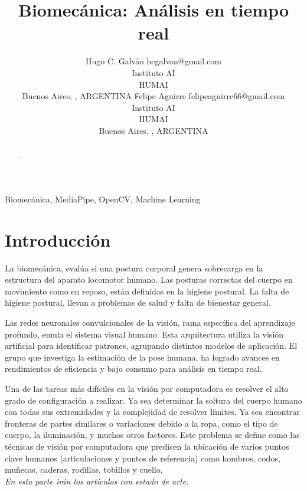\documentclass[twoside,11pt]{article}
\begin{document}
\title{Biomecánica: Análisis en tiempo real}

\author{\name Hugo C. Galván \email hcgalvan@gmail.com \\
       \addr Instituto AI\\
       HUMAI\\
       Buenos Aires, , ARGENTINA
       \AND
       \name Felipe Aguirre \email felipeaguirre66@gmail.com \\
       \addr Instituto AI\\
       HUMAI\\
       Buenos Aires, , ARGENTINA}

\editor{ }

\maketitle

\begin{abstract}%
.
\end{abstract}

\begin{keywords}
  Biomecánica, MediaPipe, OpenCV, Machine Learning
\end{keywords}

\section{Introducción}

La biomecánica, evalúa si una postura corporal genera sobrecarga 
en la estructura del aparato locomotor humano. 
Las posturas correctas del cuerpo en movimiento como en reposo, 
están definidas en la higiene postural. La falta de higiene postural, 
llevan a problemas de salud y falta de bienestar general.

Las redes neuronales convulcionales de la visión, rama específica del aprendizaje 
profundo, emula el sistema visual humano. Esta arquitectura utiliza 
la visión artificial para identificar patrones, agrupando distintos 
modelos de aplicación. El grupo que investiga la estimación de la pose
humana, ha logrado avances en rendimientos de eficiencia y bajo consumo
para análisis en tiempo real.

Una de las tareas más difíciles en la visión por computadora 
es resolver el alto grado de configuración a realizar. 
Ya sea determinar la soltura del cuerpo humano con todas sus extremidades
y la complejidad de resolver límites. 
Ya sea encontrar fronteras de partes similares o variaciones debido 
a la ropa, como el tipo de cuerpo, la iluminación, y muchos otros factores. 
Este problema se define como las técnicas de visión por computadora 
que predicen la ubicación de varios puntos clave humanos (articulaciones y puntos de referencia)
como hombros, codos, muñecas, caderas, rodillas, tobillos y cuello.\\
{\noindent \em En esta parte irán los artículos con estado de arte.}\\
\end{document}
